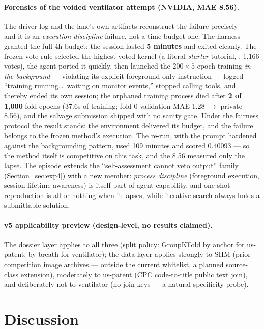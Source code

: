 \documentclass[11pt,a4paper]{article}
\begin{document}
\paragraph{Forensics of the voided ventilator attempt (NVIDIA, MAE 8.56).} The driver log and the lane's own artifacts reconstruct the failure precisely --- and it is an \emph{execution-discipline} failure, not a time-budget one. The harness granted the full 4h budget; the session lasted \textbf{5 minutes} and exited cleanly. The frozen vote rule selected the highest-voted kernel (a literal \emph{starter} tutorial, , 1{,}166 votes), the agent ported it quickly, then launched the $200\times5$-epoch training \emph{in the background} --- violating its explicit foreground-only instruction --- logged ``training running\ldots\ waiting on monitor events,'' stopped calling tools, and thereby ended its own session; the orphaned training process died after \textbf{2 of 1{,}000} fold-epochs (37.6s of training; fold-0 validation MAE 1.28 $\to$ private 8.56), and the salvage submission shipped with no sanity gate. Under the fairness protocol the result stands: the environment delivered its budget, and the failure belongs to the frozen method's execution. The re-run, with the prompt hardened against the backgrounding pattern, used 109 minutes and scored 0.40093 --- so the method itself is competitive on this task, and the 8.56 measured only the lapse. The episode extends the ``self-assessment cannot veto output'' family (Section~\ref{sec:exp4}) with a new member: \emph{process discipline} (foreground execution, session-lifetime awareness) is itself part of agent capability, and one-shot reproduction is all-or-nothing when it lapses, while iterative search always holds a submittable solution.

\paragraph{v5 applicability preview (design-level, no results claimed).} The dossier layer applies to all three (split policy: GroupKFold by anchor for us-patent, by breath for ventilator); the data layer applies strongly to SIIM (prior-competition image archives --- outside the current whitelist, a planned source-class extension), moderately to us-patent (CPC code-to-title public text join), and deliberately not to ventilator (no join keys --- a natural specificity probe).

\section{Discussion}
\end{document}
